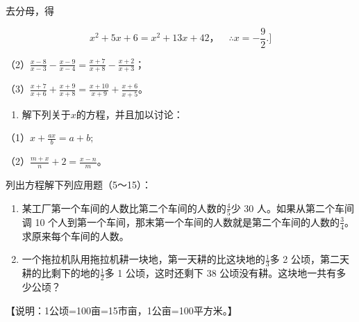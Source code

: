 去分母，得

\[
x ^ {2} + 5 x + 6 = x ^ {2} + 13 x + 42\text{，} \quad \therefore x = - \frac{9}{2}. ]
\]

（2）\(\frac{x - 8}{x - 3} - \frac{x - 9}{x - 4} = \frac{x + 7}{x + 8} - \frac{x + 2}{x + 3}\)；

（3）\(\frac{x + 7}{x + 6} + \frac{x + 9}{x + 8} = \frac{x + 10}{x + 9} + \frac{x + 6}{x + 5}\)。

\begin{enumerate}[start=4]
\item
  解下列关于\(x\)的方程，并且加以讨论：
\end{enumerate}

（1）\(x + \frac{ax}{b} = a + b;\)

（2）\(\frac{m + x}{n} + 2 = \frac{x - n}{m}\)。

列出方程解下列应用题（5～15）：

\begin{enumerate}[start=5]
\item
  某工厂第一个车间的人数比第二个车间的人数的\(\frac{4}{5}\)少 30
  人。如果从第二个车间调 10
  个人到第一个车间，那末第一个车间的人数就是第二个车间的人数的\(\frac{3}{4}\)。求原来每个车间的人数。
\item
  一个拖拉机队用拖拉机耕一块地，第一天耕的比这块地的\(\frac{1}{3}\)多 2
  公顷，第二天耕的比剩下的地的\(\frac{1}{2}\)多 1 公顷，这时还剩下 38
  公顷没有耕。这块地一共有多少公顷？
\end{enumerate}

【说明：1公顷=100亩=15市亩，1公亩=100平方米。】


